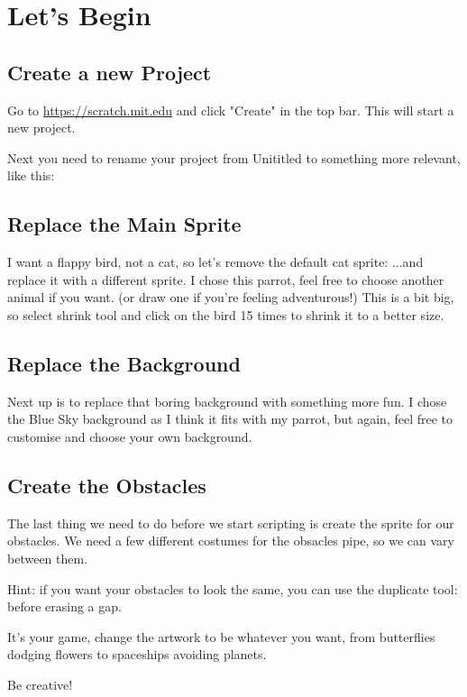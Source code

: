 \section{Let's Begin}
\subsection{Create a new Project}
Go to \url{https://scratch.mit.edu} and click "Create" in the top bar.
This will start a new project.

Next you need to rename your project from Unititled to something more relevant, like this:

\subsection{Replace the Main Sprite}
I want a flappy bird, not a cat, so let's remove the default cat sprite:
...and replace it with a different sprite.
 I chose this parrot, feel free to choose another animal if you want. (or draw one if you're feeling adventurous!)
 This is a bit big, so select shrink tool and click on the bird 15 times to shrink it to a better size.
 
 \subsection{Replace the Background}
 Next up is to replace that boring background with something more fun. 
 I chose the Blue Sky background as I think it fits with my parrot, but again, feel free to customise and choose your own background.
 
 \subsection{Create the Obstacles}
 The last thing we need to do before we start scripting is create the sprite for our obstacles.
 We need a few different costumes for the obsacles pipe, so we can vary between them.

  
Hint: if you want your obstacles to look the same, you can use the duplicate tool:  before erasing a gap.

 
 \vfill
 
  It's your game, change the artwork to be whatever you want, from butterflies dodging flowers to spaceships avoiding planets.
 
 \vfill
 
 Be creative!
 

\vfill\vfill\vfill\vfill
